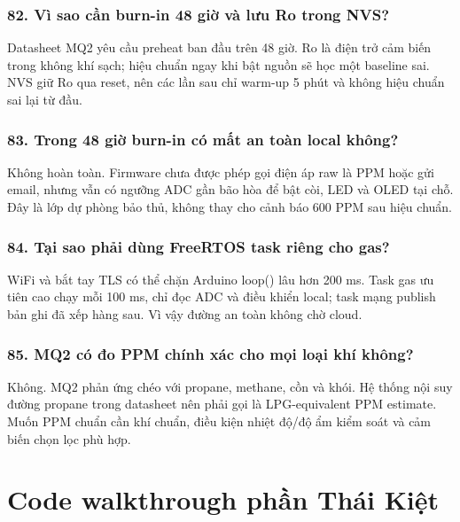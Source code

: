 \documentclass[11pt,oneside,openany]{book}
\renewcommand{\texttt}[1]{{\ttfamily\small #1}}
\begin{document}
\subsection{\texorpdfstring{82. Vì sao cần burn-in 48 giờ và lưu
\texttt{Ro} trong
NVS?}{82. Vì sao cần burn-in 48 giờ và lưu Ro trong NVS?}}\label{82-vuxec-sao-cux1ea7n-burn-in-48-giux1edd-vuxe0-lux1b0u-ro-trong-nvs}

Datasheet MQ2 yêu cầu preheat ban đầu trên 48 giờ. \texttt{Ro} là điện
trở cảm biến trong không khí sạch; hiệu chuẩn ngay khi bật nguồn sẽ học
một baseline sai. NVS giữ \texttt{Ro} qua reset, nên các lần sau chỉ
warm-up 5 phút và không hiệu chuẩn sai lại từ đầu.

\subsection{83. Trong 48 giờ burn-in có mất an toàn local
không?}\label{83-trong-48-giux1edd-burn-in-cuxf3-mux1ea5t-an-touxe0n-local-khuxf4ng}

Không hoàn toàn. Firmware chưa được phép gọi điện áp raw là PPM hoặc gửi
email, nhưng vẫn có ngưỡng ADC gần bão hòa để bật còi, LED và OLED tại
chỗ. Đây là lớp dự phòng bảo thủ, không thay cho cảnh báo 600 PPM sau
hiệu chuẩn.

\subsection{84. Tại sao phải dùng FreeRTOS task riêng cho
gas?}\label{84-tux1ea1i-sao-phux1ea3i-duxf9ng-freertos-task-riuxeang-cho-gas}

WiFi và bắt tay TLS có thể chặn Arduino \texttt{loop()} lâu hơn 200 ms.
Task gas ưu tiên cao chạy mỗi 100 ms, chỉ đọc ADC và điều khiển local;
task mạng publish bản ghi đã xếp hàng sau. Vì vậy đường an toàn không
chờ cloud.

\subsection{85. MQ2 có đo PPM chính xác cho mọi loại khí
không?}\label{85-mq2-cuxf3-ux111o-ppm-chuxednh-xuxe1c-cho-mux1ecdi-loux1ea1i-khuxed-khuxf4ng}

Không. MQ2 phản ứng chéo với propane, methane, cồn và khói. Hệ thống nội
suy đường propane trong datasheet nên phải gọi là LPG-equivalent PPM
estimate. Muốn PPM chuẩn cần khí chuẩn, điều kiện nhiệt độ/độ ẩm kiểm
soát và cảm biến chọn lọc phù hợp.

\chapter{Code walkthrough phần Thái
Kiệt}\label{code-walkthrough-phux1ea7n-thuxe1i-kiux1ec7t}
\end{document}
